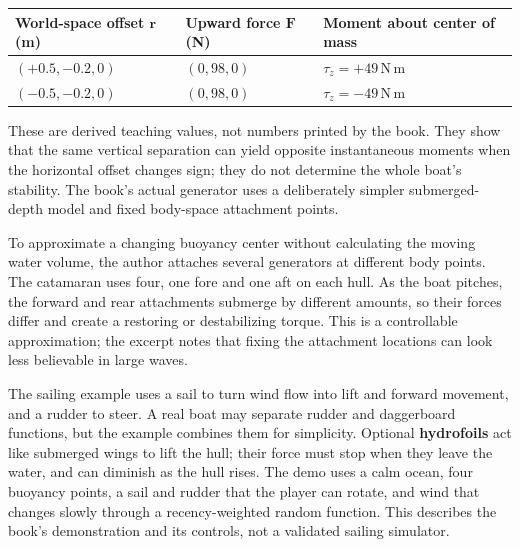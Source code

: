 {\def\LTcaptype{none} %
\begin{longtable}[]{@{}
  >{\raggedright\arraybackslash}p{}
  >{\raggedright\arraybackslash}p{}
  >{\raggedright\arraybackslash}p{}@{}}
\toprule\noalign{}
\begin{minipage}[b]{\linewidth}\raggedright
World-space offset \(\mathbf r\) (m)
\end{minipage} & \begin{minipage}[b]{\linewidth}\raggedright
Upward force \(\mathbf F\) (N)
\end{minipage} & \begin{minipage}[b]{\linewidth}\raggedright
Moment about center of mass
\end{minipage} \\
\midrule\noalign{}
\endhead
\bottomrule\noalign{}
\endlastfoot
\((+0.5,-0.2,0)\) & \((0,98,0)\) & \(\tau_z=+49\,\mathrm{N\,m}\) \\
\((-0.5,-0.2,0)\) & \((0,98,0)\) & \(\tau_z=-49\,\mathrm{N\,m}\) \\
\end{longtable}
}

These are derived teaching values, not numbers printed by the book. They show that the same vertical separation can yield opposite instantaneous moments when the horizontal offset changes sign; they do not determine the whole boat's stability. The book's actual generator uses a deliberately simpler submerged-depth model and fixed body-space attachment points.

To approximate a changing buoyancy center without calculating the moving water volume, the author attaches several generators at different body points. The catamaran uses four, one fore and one aft on each hull. As the boat pitches, the forward and rear attachments submerge by different amounts, so their forces differ and create a restoring or destabilizing torque. This is a controllable approximation; the excerpt notes that fixing the attachment locations can look less believable in large waves.

The sailing example uses a sail to turn wind flow into lift and forward movement, and a rudder to steer. A real boat may separate rudder and daggerboard functions, but the example combines them for simplicity. Optional \textbf{hydrofoils} act like submerged wings to lift the hull; their force must stop when they leave the water, and can diminish as the hull rises. The demo uses a calm ocean, four buoyancy points, a sail and rudder that the player can rotate, and wind that changes slowly through a recency-weighted random function. This describes the book's demonstration and its controls, not a validated sailing simulator.

